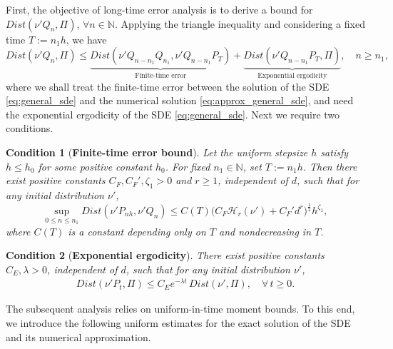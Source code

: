 \documentclass[12pt]{article}
\numberwithin{equation}{section}
\newtheorem{con}{Condition}[section]
\begin{document}
First, the objective of long-time error analysis  is to derive a bound for $\textit{Dist} (\nu' Q_n, \Pi)$, $\forall n \in \mathbb{N}$. Applying the triangle inequality and considering a fixed time $T := n_1 h$, we have
\begin{equation}
\label{eq:tri-inequ-framework} 
\textit{Dist} (\nu' Q_n, \Pi)
\leq  
\underbrace{
\textit{Dist}  (\nu' 
Q_{n-n_{1}}
Q_{n_{1}},
\nu' 
Q_{n-n_{1}} 
P_{T} )  
}_{\text{Finite-time error}}
 +
\underbrace{
\textit{Dist}   ( \nu' 
Q_{n-n_{1}} 
P_{T}, 
\Pi)
}_{\text{Exponential ergodicity}},
\quad
n \geq n_1,
\end{equation}
where we shall treat the finite-time error between the solution of the SDE \eqref{eq:general_sde} and the numerical solution \eqref{eq:approx_general_sde}, and  need the exponential ergodicity of the SDE \eqref{eq:general_sde}. Next we require two conditions.

\begin{con}[\textbf{Finite-time error bound}]
\label{con:finite-error}
Let the uniform stepsize $h$ satisfy $h \leq h_0$ for some positive constant $h_0$.
For fixed $n_1\in \mathbb{N}$, set $T:=n_1h$. Then there exist positive constants $C_F, C_F',\zeta_1>0$ and $r\ge 1$, independent of $d$, such that for any 
initial distribution $\nu'$,
\begin{equation}
\sup_{0\leq n\leq n_1}
\textit{Dist}
(\nu' P_{nh}, \nu' Q_n) 
\le
C(T) 
\big( 
C_F
\mathcal{H}_{r}
(\nu')
+
C_F'
d^{r}
\big)^{\frac{1}{2}}
h^{\zeta_1},
\end{equation}
where $C(T)$ is a constant depending only on $T$ and nondecreasing in $T$.
\end{con}






\begin{con}[\textbf{Exponential ergodicity}]\label{con:exp-erg}
There exist positive constants $C_E,\lambda>0$, independent of $d$,   such that  for any 
initial distribution $\nu'$,
\begin{align}
\textit{Dist}
(\nu' P_t, \Pi) 
\leq  
C_E e^{-\lambda t} \, \textit{Dist}
(\nu', \Pi),
\quad 
\forall\,
t \geq 0.
\end{align}
\end{con}

The subsequent analysis relies on uniform-in-time moment bounds. To this end, we introduce the following uniform estimates for the exact solution of the SDE and its numerical approximation.
\end{document}
